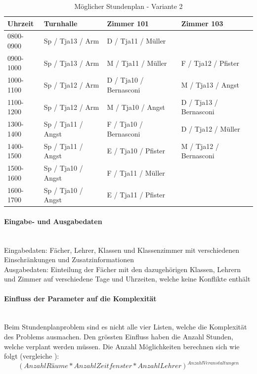 \begin{table}[ht]
\centering
  \begin{tabular}{ l | l | l | l }
	\hline
	\rowcolor{gray}
	\textbf{Uhrzeit} 	& \textbf{Turnhalle}	& \textbf{Zimmer 101} 	& \textbf{Zimmer 103}	\\ \hline
	0800-0900		& Sp / Tja13 / Arm		& D / Tja11 / Müller		& 				\\ \hline
	0900-1000		& Sp / Tja13 / Arm		& M / Tja11 / Müller		& F / Tja12 / Pfister		\\ \hline
	1000-1100		& Sp / Tja12 / Arm		& D / Tja10 / Bernasconi	& M / Tja13 / Angst		\\ \hline
	1100-1200		& Sp / Tja12 / Arm		& M / Tja10 / Angst		& D / Tja13 / Bernasconi	\\ \hline \hline
	1300-1400		& Sp / Tja11 / Angst	& F / Tja10 / Bernasconi	& D / Tja12 / Müller		\\ \hline
	1400-1500		& Sp / Tja11 / Angst	& E / Tja10 / Pfister		& M / Tja12 / Bernasconi	\\ \hline
	1500-1600		& Sp / Tja10 / Angst	& F / Tja11 / Müller		& 				\\ \hline
	1600-1700		& Sp / Tja10 / Angst	& E / Tja11 / Pfister		& 				\\ \hline
  \end{tabular}
   \caption{Möglicher Stundenplan - Variante 2}\label{table:timetable_2}
\end{table}

\FloatBarrier

	\paragraph{Eingabe- und Ausgabedaten}\mbox{}\\
	Eingabedaten: Fächer, Lehrer, Klassen und Klassenzimmer mit verschiedenen Einschränkungen und Zusatzinformationen\\
	Ausgabedaten: Einteilung der Fächer mit den dazugehörigen Klassen, Lehrern und Zimmer auf verschiedene Tage und Uhrzeiten, welche keine Konflikte enthält

	\paragraph{Einfluss der Parameter auf die Komplexität}\mbox{}\\
	Beim Stundenplanproblem sind es nicht alle vier Listen, welche die Komplexität des Problems ausmachen. Den grössten Einfluss haben die Anzahl Stunden, welche verplant werden 
	müssen. Die Anzahl Möglichkeiten berechnen sich wie folgt (vergleiche \cite{scheduling_komplex}): 
	\[(Anzahl Räume * Anzahl Zeitfenster * Anzahl Lehrer)^{Anzahl Veranstaltungen}\]


